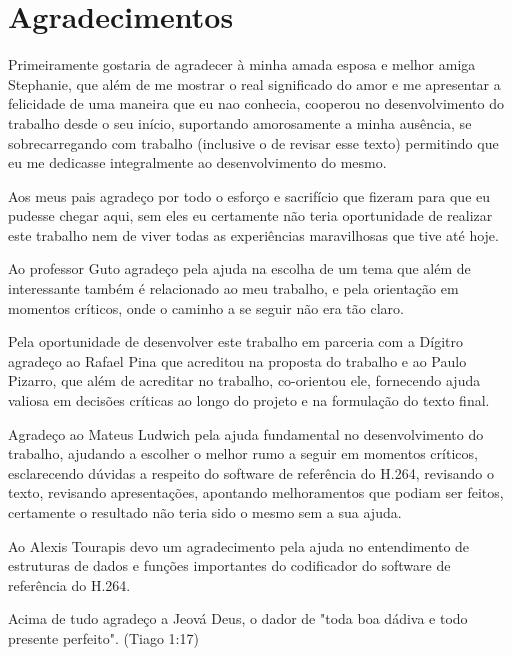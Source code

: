 \chapter*{Agradecimentos}

Primeiramente gostaria de agradecer à minha amada esposa e melhor amiga Stephanie, que além de me mostrar o real significado do amor e me apresentar a felicidade de uma maneira que eu nao conhecia, cooperou no desenvolvimento do trabalho desde o seu início, suportando amorosamente a minha ausência, se sobrecarregando com trabalho (inclusive o de revisar esse texto) permitindo que eu me dedicasse integralmente ao desenvolvimento do mesmo.

Aos meus pais agradeço por todo o esforço e sacrifício que fizeram para que eu pudesse chegar aqui, sem eles eu certamente não teria oportunidade de realizar este trabalho nem de viver todas as experiências maravilhosas que tive até hoje.

Ao professor Guto agradeço pela ajuda na escolha de um tema que além de interessante também é relacionado ao meu trabalho, e pela orientação em momentos críticos, onde o caminho a se seguir não era tão claro. 

Pela oportunidade de desenvolver este trabalho em parceria com a Dígitro agradeço ao Rafael Pina que acreditou na proposta do trabalho e ao Paulo Pizarro, que além de acreditar no trabalho, co-orientou ele, fornecendo ajuda valiosa em decisões críticas ao longo do projeto e na formulação do texto final.

Agradeço ao Mateus Ludwich pela ajuda fundamental no desenvolvimento do trabalho, ajudando a escolher o melhor rumo a seguir em momentos críticos, esclarecendo dúvidas a respeito do software de referência do H.264, revisando o texto, revisando apresentações, apontando melhoramentos que podiam ser feitos, certamente o resultado não teria sido o mesmo sem a sua ajuda.

Ao Alexis Tourapis devo um agradecimento pela ajuda no entendimento de estruturas de dados e funções importantes do codificador do software de referência do H.264.

Acima de tudo agradeço a Jeová Deus, o dador de "toda boa dádiva e todo presente perfeito". (Tiago 1:17)


